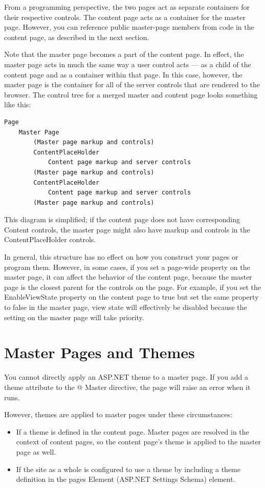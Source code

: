 From a programming perspective, the two pages act as separate containers for their respective controls. The content page acts as a container for the master page. However, you can reference public master-page members from code in the content page, as described in the next section.

Note that the master page becomes a part of the content page. In effect, the master page acts in much the same way a user control acts — as a child of the content page and as a container within that page. In this case, however, the master page is the container for all of the server controls that are rendered to the browser. The control tree for a merged master and content page looks something like this:
\begin{lstlisting}
Page
	Master Page
		(Master page markup and controls)
		ContentPlaceHolder
			Content page markup and server controls
		(Master page markup and controls)
		ContentPlaceHolder
			Content page markup and server controls
		(Master page markup and controls)
\end{lstlisting}
This diagram is simplified; if the content page does not have corresponding Content controls, the master page might also have markup and controls in the ContentPlaceHolder controls.

In general, this structure has no effect on how you construct your pages or program them. However, in some cases, if you set a page-wide property on the master page, it can affect the behavior of the content page, because the master page is the closest parent for the controls on the page. For example, if you set the EnableViewState property on the content page to true but set the same property to false in the master page, view state will effectively be disabled because the setting on the master page will take priority.

\section{Master Pages and Themes}
You cannot directly apply an ASP.NET theme to a master page. If you add a theme attribute to the @ Master directive, the page will raise an error when it runs.

However, themes are applied to master pages under these circumstances:
\begin{itemize}
	\item If a theme is defined in the content page. Master pages are resolved in the context of content pages, so the content page's theme is applied to the master page as well.	
	\item If the site as a whole is configured to use a theme by including a theme definition in the pages Element (ASP.NET Settings Schema) element.
\end{itemize}


